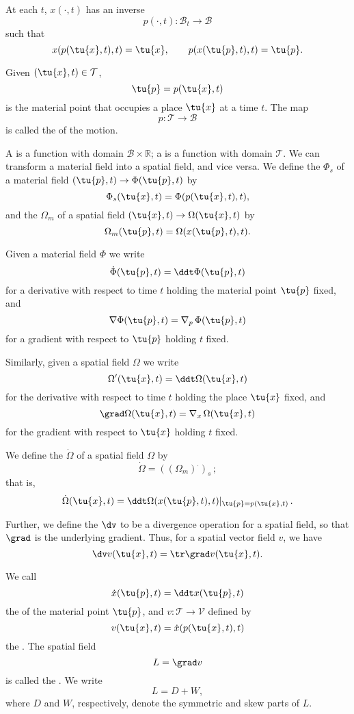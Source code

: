 At each $t$, $x(\cdot,t)$ has an inverse $$p(\cdot,t):\mathcal B_t \rightarrow \mathcal B$$
such that $$x(p(\tu{x},t),t)=\tu{x}, \qquad p(x(\tu{p},t),t)=\tu{p}.$$

Given $(\tu{x},t) \in \mathcal T$, $$\tu{p}=p(\tu{x},t)$$ is the material point that occupies 
a place $\tu{x}$ at a time $t$. The map $$p:\mathcal T\rightarrow\mathcal B$$ is
called the  of the motion.

A  is a function with domain $\mathcal B\times\mathbb R$; a 
is a function with domain $\mathcal T$. We can transform a material field into a spatial field, 
and vice versa. 
We define the  $\Phi_s$ of a material field 
$(\tu{p},t)\rightarrow\Phi(\tu{p},t)$ by $$\Phi_s(\tu{x},t)=\Phi(p(\tu{x},t),t),$$
and the  $\Omega_m$ of a spatial field
$(\tu{x},t)\rightarrow\Omega(\tu{x},t)$ by $$\Omega_m(\tu{p},t)=\Omega(x(\tu{p},t),t).$$

Given a material field $\Phi$ we write 
$$\dot\Phi(\tu{p},t)=\ddt \Phi(\tu{p},t)$$
for a derivative with respect to time $t$ holding the material point $\tu{p}$ fixed, and
$$\nabla\Phi(\tu{p},t)=\nabla_p\,\Phi(\tu{p},t)$$
for a gradient with respect to $\tu{p}$ holding $t$ fixed.

Similarly, given a spatial field $\Omega$ we write 
$$\Omega'(\tu{x},t)=\ddt \Omega(\tu{x},t)$$
for the derivative with respect to time $t$ holding the place $\tu{x}$ fixed, and
$$\grad\Omega(\tu{x},t)=\nabla_x\,\Omega(\tu{x},t)$$
for the gradient with respect to $\tu{x}$ holding $t$ fixed.

We define the  $\dot\Omega$ of a spatial field $\Omega$ by
$$\dot\Omega=((\Omega_m)^.)_s\,;$$ that is,
$$\dot\Omega(\tu{x},t)=\ddt \Omega(x(\tu{p},t),t)|_{\tu{p}=p(\tu{x},t)}\,.$$

Further, we define the  $\dv$ to be a divergence
operation for a spatial field, so that $\grad$ is the underlying gradient. Thus,
for a spatial vector field $v$, we have 
$$\dv v(\tu{x},t)=\tr\grad v(\tu{x},t).$$

We call $$\dot x(\tu{p},t)=\ddt x(\tu{p},t)$$ the  
of the material point $\tu{p}$, and $v:\mathcal T\rightarrow\mathcal V$ defined by
$$v(\tu{x},t)=\dot x(p(\tu{x},t),t)$$ 
the . 
The spatial field $$L=\grad v$$ is called the . We write
$$L=D+W,$$ where $D$ and $W$, respectively, denote the symmetric and skew parts of $L$.

